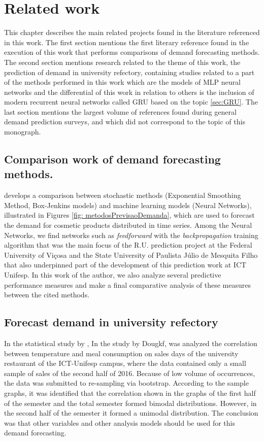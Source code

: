 \chapter{Related work} \label{cap:literatura}
  
This chapter describes the main related projects found in the literature referenced in this work. The first section mentions the first literary reference found in the execution of this work that performs comparisons of demand forecasting methods. The second section mentions research related to the theme of this work, the prediction of demand in university refectory, containing studies related to a part of the methods performed in this work which are the models of MLP neural networks and the differential of this work in relation to others is the inclusion of modern recurrent neural networks called GRU based on the topic \ref{sec:GRU}. The last section mentions the largest volume of references found during general demand prediction surveys, and which did not correspond to the topic of this monograph.

    \section{Comparison work of demand forecasting methods.}
        develops a comparison between stochastic methods (Exponential Smoothing Method, Box-Jenkins models) and machine learning models (Neural Networks), illustrated in Figures \ref{fig: metodosPrevisaoDemanda}, which are used to forecast the demand for cosmetic products distributed in time series. Among the Neural Networks, we find networks such as \textit{feedforward} with the \textit{backpropagation} training algorithm that was the main focus of the R.U. prediction project at the Federal University of Viçosa and the State University of Paulista Júlio de Mesquita Filho that also underpinned part of the development of this prediction work at ICT Unifesp. In this work of the author, we also analyze several predictive performance measures and make a final comparative analysis of these measures between the cited methods.
    
    \section{Forecast demand in university refectory}
        In the statistical study by , In the study by Dougkf, was analyzed the correlation between temperature and meal consumption on sales days of the university restaurant of the ICT-Unifesp campus, where the data contained only a small sample of sales of the second half of 2016. Because of low volume of occurrences, the data was submitted to re-sampling via bootstrap. According to the sample graphs, it was identified that the correlation shown in the graphs of the first half of the semester and the total semester formed bimodal distributions. However, in the second half of the semester it formed a unimodal distribution. The conclusion was that other variables and other analysis models should be used for this demand forecasting.
        
